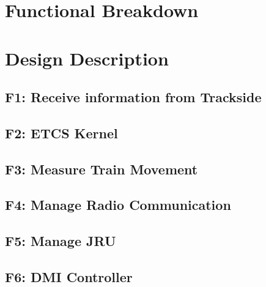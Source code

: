 \documentclass{template/openetcs_report}
\begin{document}
\linenumbers



\mainmatter


\part{Functional Breakdown}




\part{Design Description}


\chapter{F1: Receive information from Trackside}

\chapter{F2: ETCS Kernel}












\chapter{F3: Measure Train Movement}

\chapter{F4: Manage Radio Communication}

\chapter{F5: Manage JRU}

\chapter{F6: DMI Controller}







\end{document}
